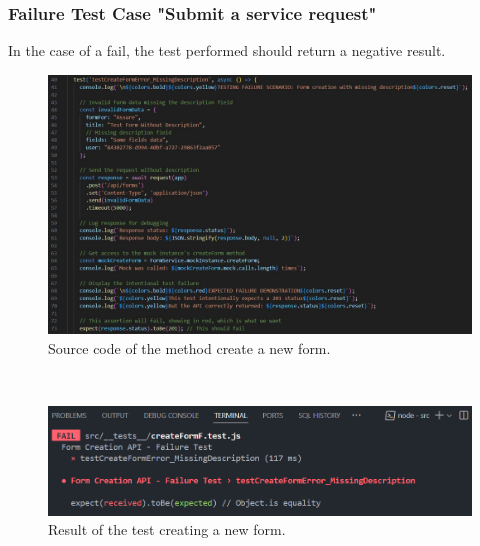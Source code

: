 \subsubsection{Failure Test Case "Submit a service request"}
In the case of a fail, the test performed should return a negative result.
\begin{figure}[h!]
    \centering
    \includegraphics[width=1\textwidth]{figures/createformFcode.JPG}
    \caption{Source code of the method create a new form.}
\end{figure} \
\begin{figure}[h!]
    \centering
    \includegraphics[width=1\textwidth]{figures/test fail create form.png}  %
    \caption{Result of the test creating a new form.}
\end{figure} \

